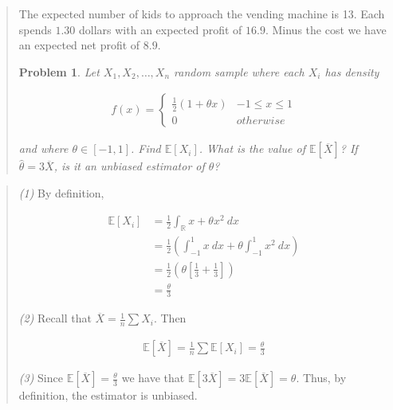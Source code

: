 \documentclass[a4paper, 12pt]{article}
\newtheorem{problem}{Problem}
\newtheorem{problem}{Problem}
\begin{document}
\small
\begin{quote}

The expected number of kids to approach the vending machine is 13. Each spends
$1.30$ dollars with an expected profit of $16.9$. Minus the cost we have an
expected net profit of $8.9$.

\pagebreak 

\begin{problem}
    Let $X_1, X_2, \ldots, X_n$ random sample where each $X_i$ has density 

    \begin{align*}
        f(x) = \begin{cases}
            \frac{1}{2} \left( 1 + \theta x \right) & -1 \leq x \leq 1 \\ 
            0 & otherwise
        \end{cases}
    \end{align*}

    and where $\theta \in [-1, 1]$. Find $\mathbb{E}\left[ X_i \right] $. What
    is the value of $\mathbb{E}\left[ \overline{X} \right] $? If $\hat{\theta} =
    3\overline{X}$, is it an unbiased estimator of $\theta$?
\end{problem}

\end{quote}
\normalsize


\small
\begin{quote}

\textit{(1)} By definition, 

\begin{align*}
    \mathbb{E}\left[ X_i \right] &=\frac{1}{2} \int_{\mathbb{R}} x + \theta x^2 ~
    dx \\ 
                                 &= \frac{1}{2} \left( \int_{-1}^{1} x ~ dx +
                                 \theta \int_{-1}^{1} x^2 ~ dx \right)  \\ 
                                 &= \frac{1}{2} \left( \theta \left[ \frac{1}{3}
                                 + \frac{1}{3} \right]  \right) \\ 
                                 &=\frac{\theta}{3}
\end{align*}

\textit{(2)} Recall that $\overline{X} = \frac{1}{n} \sum X_i$. Then 

\begin{align*}
    \mathbb{E}\left[ \overline{X} \right] = \frac{1}{n}\sum \mathbb{E}\left[ X_i
    \right]  = \frac{\theta}{3}
\end{align*}

\textit{(3)} Since $\mathbb{E}\left[ \overline{X} \right] = \frac{\theta}{3}$ we
have that $\mathbb{E}\left[ 3 \overline{X} \right] = 3 \mathbb{E}\left[
\overline{X} \right]  = \theta$. Thus, by definition, the estimator is unbiased.




\end{quote}
\normalsize
\end{document}
